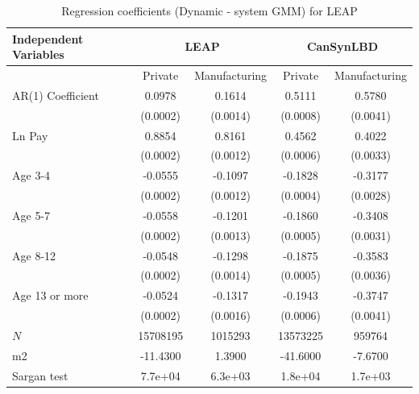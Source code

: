 \documentclass[10pt,twoside]{article}
\newcommand{\sym}[1]{\rlap{#1}}
\begin{document}
\begin{table}[H]
  \centering
\begin{threeparttable}
 \caption{Regression coefficients (Dynamic - system GMM) for LEAP} \label{tab:Dynamic - system GMM_can} \medskip
\renewcommand{\arraystretch}{1}
\begin{tabular}{l|c c| c c}
\toprule
\textbf{Independent Variables}&\multicolumn{2}{c|}{\textbf{LEAP}} &  \multicolumn{2}{c}{\textbf{CanSynLBD}}\\
\midrule
&\multicolumn{1}{c}{Private}&\multicolumn{1}{c}{Manufacturing}&\multicolumn{1}{c}{Private}&\multicolumn{1}{c}{Manufacturing}\\
\hline
AR(1) Coefficient&   0.0978\sym{***}&   0.1614\sym{***}&   0.5111\sym{***}&   0.5780\sym{***}\\
          & (0.0002)         & (0.0014)         & (0.0008)         & (0.0041)         \\
[1em]
Ln Pay    &   0.8854\sym{***}&   0.8161\sym{***}&   0.4562\sym{***}&   0.4022\sym{***}\\
          & (0.0002)         & (0.0012)         & (0.0006)         & (0.0033)         \\
[1em]
Age 3-4   &  -0.0555\sym{***}&  -0.1097\sym{***}&  -0.1828\sym{***}&  -0.3177\sym{***}\\
          & (0.0002)         & (0.0012)         & (0.0004)         & (0.0028)         \\
[1em]
Age 5-7   &  -0.0558\sym{***}&  -0.1201\sym{***}&  -0.1860\sym{***}&  -0.3408\sym{***}\\
          & (0.0002)         & (0.0013)         & (0.0005)         & (0.0031)         \\
[1em]
Age 8-12  &  -0.0548\sym{***}&  -0.1298\sym{***}&  -0.1875\sym{***}&  -0.3583\sym{***}\\
          & (0.0002)         & (0.0014)         & (0.0005)         & (0.0036)         \\
[1em]
Age 13 or more&  -0.0524\sym{***}&  -0.1317\sym{***}&  -0.1943\sym{***}&  -0.3747\sym{***}\\
          & (0.0002)         & (0.0016)         & (0.0006)         & (0.0041)         \\
\hline
\(N\)     & 15708195         &  1015293         & 13573225         &   959764         \\
m2        & -11.4300         &   1.3900         & -41.6000         &  -7.6700         \\
Sargan test&  7.7e+04         &  6.3e+03         &  1.8e+04         &  1.7e+03         \\

\end{tabular}
\end{threeparttable}
\end{table}
\end{document}
